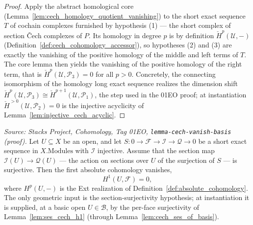 \begin{proof}
  \leanok
  Apply the abstract homological core (Lemma~\ref{lem:cech_homology_quotient_vanishing}) to the
  short exact sequence \(T\) of cochain complexes furnished by hypothesis (1) — the short complex of
  section {\v C}ech complexes of \(P\). Its homology in degree \(p\) is by definition
  \(\check{H}^p(\mathcal{U}, -)\) (Definition~\ref{def:cech_cohomology_accessor}), so hypotheses (2)
  and (3) are exactly the vanishing of the positive homology of the middle and left terms of \(T\).
  The core lemma then yields the vanishing of the positive homology of the right term, that is
  \(\check{H}^p(\mathcal{U}, \mathcal{P}_3) = 0\) for all \(p > 0\). Concretely, the connecting
  isomorphism of the homology long exact sequence realizes the dimension shift
  \(\check{H}^p(\mathcal{U}, \mathcal{P}_3) \cong \check{H}^{p+1}(\mathcal{U}, \mathcal{P}_1)\), the
  step used in the 01EO proof; at instantiation \(\check{H}^{>0}(\mathcal{U}, \mathcal{P}_2) = 0\) is
  the injective acyclicity of Lemma~\ref{lem:injective_cech_acyclic}.
\end{proof}

\begin{lemma}

\leanok
[Sheaf-cohomology base case \(H^1(U, \mathcal{F}) = 0\)]
  \label{lem:absolute_cohomology_one_vanishing}
  \textit{Source: Stacks Project, Cohomology, Tag 01EO,
  \texttt{lemma-cech-vanish-basis} (proof).}
  Let \(U \subseteq X\) be an open, and let
  \(S : 0 \to \mathcal{F} \to \mathcal{I} \to \mathcal{Q} \to 0\) be a short exact sequence in
  \(X.\mathrm{Modules}\) with \(\mathcal{I}\) injective. Assume that the section map
  \(\mathcal{I}(U) \to \mathcal{Q}(U)\) — the action on sections over \(U\) of the surjection of
  \(S\) — is surjective. Then the first absolute cohomology vanishes,
  \[
    H^1(U, \mathcal{F}) = 0,
  \]
  where \(H^p(U, -)\) is the Ext realization of Definition~\ref{def:absolute_cohomology}. The only
  geometric input is the section-surjectivity hypothesis; at instantiation it is supplied, at a basic
  open \(U \in \mathcal{B}\), by the per-face surjectivity of Lemma~\ref{lem:ses_cech_h1} (through
  Lemma~\ref{lem:cech_ses_of_basis}).
\end{lemma}


